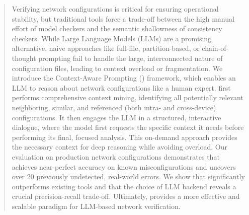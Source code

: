 
\begin{abstract}

Verifying network configurations is critical for ensuring operational stability, but traditional tools force a trade-off between the high manual effort of model checkers and the semantic shallowness of consistency checkers. While Large Language Models (LLMs) are a promising alternative, naive approaches like full-file, partition-based, or chain-of-thought prompting fail to handle the large, interconnected nature of configuration files, leading to context overload or fragmentation.
We introduce the Context-Aware Prompting (\sysname{}) framework, which enables an LLM to reason about network configurations like a human expert. \sysname{} first performs comprehensive context mining, identifying all potentially relevant neighboring, similar, and referenced (both intra- and cross-device) configurations. It then engages the LLM in a structured, interactive dialogue, where the model first requests the specific context it needs before performing its final, focused analysis. This on-demand approach provides the necessary context for deep reasoning while avoiding overload.
Our evaluation on production network configurations demonstrates that \sysname{} achieves near-perfect accuracy on known misconfigurations and uncovers over 20 previously undetected, real-world errors. We show that \sysname{} significantly outperforms existing tools and that the choice of LLM backend reveals a crucial precision-recall trade-off. Ultimately, \sysname{} provides a more effective and scalable paradigm for LLM-based network verification.

\end{abstract}
